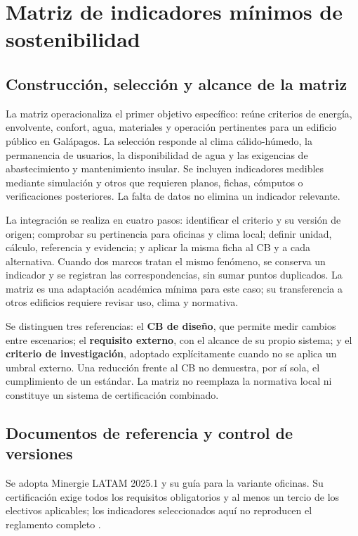 \section{Matriz de indicadores mínimos de sostenibilidad}
\label{sec:matriz-sostenibilidad}
\subsection{Construcción, selección y alcance de la matriz}
La matriz operacionaliza el primer objetivo específico: reúne criterios de energía, envolvente, confort, agua, materiales y operación pertinentes para un edificio público en Galápagos. La selección responde al clima cálido-húmedo, la permanencia de usuarios, la disponibilidad de agua y las exigencias de abastecimiento y mantenimiento insular. Se incluyen indicadores medibles mediante simulación y otros que requieren planos, fichas, cómputos o verificaciones posteriores. La falta de datos no elimina un indicador relevante.

La integración se realiza en cuatro pasos: identificar el criterio y su versión de origen; comprobar su pertinencia para oficinas y clima local; definir unidad, cálculo, referencia y evidencia; y aplicar la misma ficha al CB y a cada alternativa. Cuando dos marcos tratan el mismo fenómeno, se conserva un indicador y se registran las correspondencias, sin sumar puntos duplicados. La matriz es una adaptación académica mínima para este caso; su transferencia a otros edificios requiere revisar uso, clima y normativa.

Se distinguen tres referencias: el \textbf{CB de diseño}, que permite medir cambios entre escenarios; el \textbf{requisito externo}, con el alcance de su propio sistema; y el \textbf{criterio de investigación}, adoptado explícitamente cuando no se aplica un umbral externo. Una reducción frente al CB no demuestra, por sí sola, el cumplimiento de un estándar. La matriz no reemplaza la normativa local ni constituye un sistema de certificación combinado.

\par\medskip
\subsection{Documentos de referencia y control de versiones}
Se adopta Minergie LATAM 2025.1 y su guía para la variante oficinas. Su certificación exige todos los requisitos obligatorios y al menos un tercio de los electivos aplicables; los indicadores seleccionados aquí no reproducen el reglamento completo \parencite{minergieLatamReglamento2025,minergieLatamGuia2025}.

